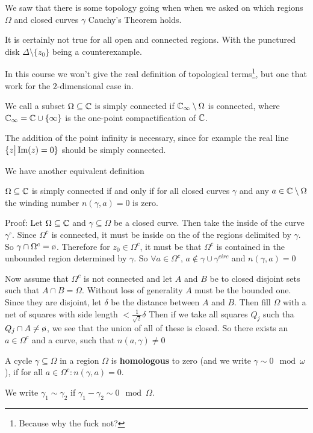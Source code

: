 
We saw that there is some topology going when when we asked on which regions $\Omega$ and closed curves $\gamma$ Cauchy's Theorem holds.

It is certainly not true for all open and connected regions. With the punctured disk $\Delta \setminus \{z_0\}$ being a counterexample.

In this course we won't give the real definition of topological terms\footnote{Because why the fuck not?}, but one that work for the $2$-dimensional case in.

\begin{definition}[]
We call a subset $\Omega \subseteq \mathbb{C}$ is simply connected if $\mathbb{C}_{\infty} \setminus \Omega$ is connected, where $\mathbb{C}_{\infty} = \mathbb{C} \cup \{\infty\}$ is the one-point compactification of $\mathbb{C}$.
\end{definition}
The addition of the point infinity is necessary, since for example the real line $\{z \big\vert \operatorname{Im}(z) = 0\}$ should be simply connected.

We have another equivalent definition
\begin{proposition}[]
	$\Omega \subseteq \mathbb{C}$ is simply connected if and only if for all closed curves $\gamma$ and any $a \in \mathbb{C} \setminus \Omega$ the winding number $n(\gamma,a) = 0$ is zero.
\end{proposition}

Proof: Let $\Omega \subseteq \mathbb{C}$ and $\gamma \subseteq \Omega$ be a closed curve. Then take the inside of the curve $\gamma^{\circ}$. Since $\Omega^{c}$ is connected, it must be inside on the of the regions delimited by $\gamma$. So $\gamma \cap \Omega^{c} = \es$.
Therefore for $z_0 \in \Omega^{c}$, it must be that $\Omega^{c}$ is contained in the unbounded region determined by $\gamma$. 
So $\forall a \in \Omega^{c}$, $a \notin \gamma \cup \gamma^{circ}$ and $n(\gamma,a) = 0$

Now assume that $\Omega^{c}$ is not connected and let $A$ and $B$ be to closed disjoint sets such that $A \cap B = \Omega$.
Without loss of generality $A$ must be the bounded one. Since they are disjoint, let $\delta$ be the distance between $A$ and $B$. Then fill $\Omega$ with a net of squares with side length $< \frac{1}{\sqrt{2}}\delta$
Then if we take all squares $Q_j$ such tha $Q_j \cap A \neq \es$, we see that the union of all of these is closed.
So there exists an $a \in \Omega^{c}$ and a curve, such that $n(a,\gamma) \neq 0$

\begin{definition}[]
	A cycle $\gamma \subseteq \Omega$ in a region $\Omega$ is \textbf{homologous} to zero (and we write $\gamma \sim 0 \mod \omega$), if for all $a \in \Omega^{c}: n(\gamma,a) = 0$.

	We write $\gamma_1 \sim \gamma_2$ if $\gamma_1 - \gamma_2 \sim 0 \mod \Omega$.
\end{definition}

